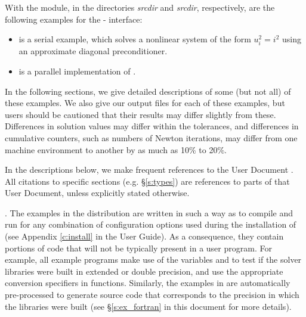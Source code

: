 \vspace{0.2in}\noindent
With the {\fkinsol} module, in the directories 
{\em srcdir} and
{\em srcdir}, respectively, are the
following examples for the {\F}-{\CC} interface:
\begin{itemize}
\item {}
  is a serial example, which solves a nonlinear system of the form
  $u_i^2 = i^2$ using an approximate diagonal preconditioner.
\item {}
  is a parallel implementation of .
\end{itemize}

\vspace{0.2in}\noindent 
In the following sections, we give detailed descriptions of some (but
not all) of these examples.  We also give our output files for
each of these examples, but users should be cautioned that their
results may differ slightly from these.  Differences in solution
values may differ within the tolerances, and differences in cumulative
counters, such as numbers of Newton iterations, may differ
from one machine environment to another by as much as 10\% to 20\%.

In the descriptions below, we make frequent references to the {\kinsol}
User Document \cite{kinsol_ug}.  All citations to specific sections
(e.g. \S\ref{s:types}) are references to parts of that User Document, unless
explicitly stated otherwise.

\vspace{0.2in}. 
The examples in the {\kinsol} distribution are written in such a way as
to compile and run for any combination of configuration options used during
the installation of {\sundials} (see Appendix \ref{c:install} in the User Guide).
As a consequence, they contain portions of code that will not be typically present in a
user program. For example, all {\CC} example programs make use of the
variables  and 
to test if the solver libraries were built in extended or double precision, 
and use the appropriate conversion specifiers in  functions.
Similarly, the {\F} examples in {\fkinsol} are automatically
pre-processed to generate source code that corresponds to the
precision in which the {\kinsol} libraries were built (see
\S\ref{s:ex_fortran} in this document for more details).

